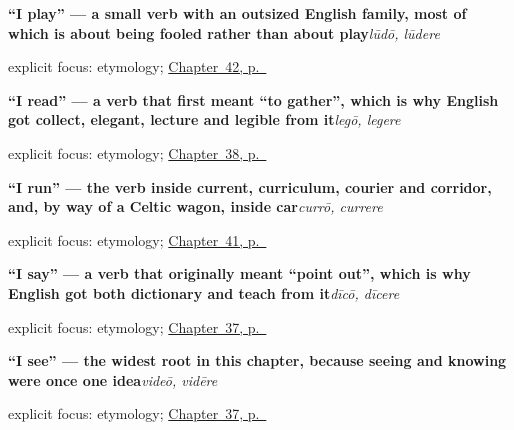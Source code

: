 \noindent\begin{minipage}[t]{\linewidth}
\raggedright
\textbf{\textquotedblleft{}I play\textquotedblright{} — a small verb with an outsized English family, most of which is about being fooled rather than about play}\enspace\emph{lūdō, lūdere}\par
\footnotesize explicit focus: etymology; \hyperref[ch:la-getting-and-waiting-verbs]{Chapter~42, p.~\pageref*{ch:la-getting-and-waiting-verbs}}
\end{minipage}\par\smallskip

\noindent\begin{minipage}[t]{\linewidth}
\raggedright
\textbf{\textquotedblleft{}I read\textquotedblright{} — a verb that first meant \textquotedblleft{}to gather\textquotedblright{}, which is why English got collect, elegant, lecture and legible from it}\enspace\emph{legō, legere}\par
\footnotesize explicit focus: etymology; \hyperref[ch:la-mind-verbs]{Chapter~38, p.~\pageref*{ch:la-mind-verbs}}
\end{minipage}\par\smallskip

\noindent\begin{minipage}[t]{\linewidth}
\raggedright
\textbf{\textquotedblleft{}I run\textquotedblright{} — the verb inside current, curriculum, courier and corridor, and, by way of a Celtic wagon, inside car}\enspace\emph{currō, currere}\par
\footnotesize explicit focus: etymology; \hyperref[ch:la-motion-verbs]{Chapter~41, p.~\pageref*{ch:la-motion-verbs}}
\end{minipage}\par\smallskip

\noindent\begin{minipage}[t]{\linewidth}
\raggedright
\textbf{\textquotedblleft{}I say\textquotedblright{} — a verb that originally meant \textquotedblleft{}point out\textquotedblright{}, which is why English got both dictionary and teach from it}\enspace\emph{dīcō, dīcere}\par
\footnotesize explicit focus: etymology; \hyperref[ch:la-core-verbs]{Chapter~37, p.~\pageref*{ch:la-core-verbs}}
\end{minipage}\par\smallskip

\noindent\begin{minipage}[t]{\linewidth}
\raggedright
\textbf{\textquotedblleft{}I see\textquotedblright{} — the widest root in this chapter, because seeing and knowing were once one idea}\enspace\emph{videō, vidēre}\par
\footnotesize explicit focus: etymology; \hyperref[ch:la-core-verbs]{Chapter~37, p.~\pageref*{ch:la-core-verbs}}
\end{minipage}\par\smallskip

